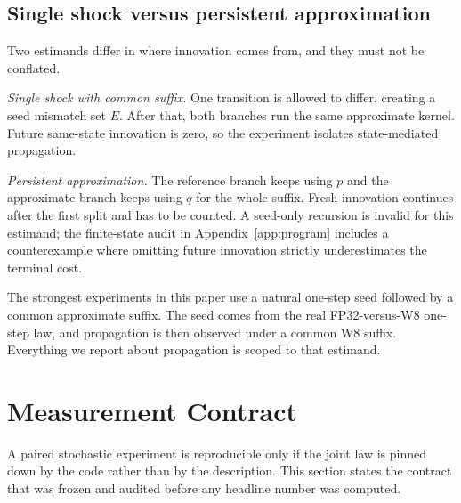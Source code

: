 \documentclass[11pt,a4paper]{article}
\theoremstyle{plain}
\theoremstyle{definition}
\theoremstyle{remark}
\begin{document}
\subsection{Single shock versus persistent approximation}
\label{sec:estimands}

Two estimands differ in where innovation comes from, and they must not be
conflated.

\emph{Single shock with common suffix.} One transition is allowed to differ,
creating a seed mismatch set $E$. After that, both branches run the same
approximate kernel. Future same-state innovation is zero, so the experiment
isolates state-mediated propagation.

\emph{Persistent approximation.} The reference branch keeps using $p$ and the
approximate branch keeps using $q$ for the whole suffix. Fresh innovation
continues after the first split and has to be counted. A seed-only recursion is
invalid for this estimand; the finite-state audit in Appendix~\ref{app:program}
includes a counterexample where omitting future innovation strictly
underestimates the terminal cost.

The strongest experiments in this paper use a natural one-step seed followed by a
common approximate suffix. The seed comes from the real FP32-versus-W8 one-step
law, and propagation is then observed under a common W8 suffix. Everything we
report about propagation is scoped to that estimand.

\section{Measurement Contract}
\label{sec:contract}

A paired stochastic experiment is reproducible only if the joint law is pinned
down by the code rather than by the description. This section states the contract
that was frozen and audited before any headline number was computed.
\end{document}
